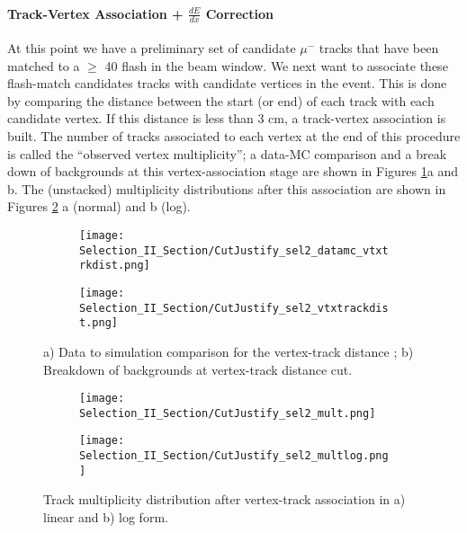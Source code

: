 \paragraph{Track-Vertex Association + $\frac{dE}{dx}$ Correction}
At this point we have a preliminary set of candidate $\mu^-$ tracks that have been matched to a $\geq$ 40 flash in the beam window. We next want to associate these flash-match candidates tracks with candidate vertices in the event. This is done by comparing the distance between the start (or end) of each track with each candidate vertex. If this distance is less than 3 cm, a track-vertex association is built.  The number of tracks associated to each vertex at the end of this procedure is called the ``observed vertex multiplicity''; a data-MC comparison and a break down of backgrounds at this vertex-association stage are shown in Figures \ref{fig:cutjust_sel2_vtxtrackdist}a and b.  The (unstacked) multiplicity distributions after this association are shown in Figures \ref{fig:cutjust_sel2_mult} a (normal) and b (log). 
\begin{figure}[h!]
\centering
  \begin{subfigure}[t]{0.4\textwidth}
    \centering
\texttt{[image: Selection\_II\_Section/CutJustify\_sel2\_datamc\_vtxtrkdist.png]}
    \caption{ }
  \end{subfigure} 
  \hspace{10 mm}
  \begin{subfigure}[t]{0.4\textwidth}
    \centering
\texttt{[image: Selection\_II\_Section/CutJustify\_sel2\_vtxtrackdist.png]}
    \caption{ }
  \end{subfigure} 
\caption{ a) Data to simulation comparison for the vertex-track distance ; b) Breakdown of backgrounds at vertex-track distance cut. }
\label{fig:cutjust_sel2_vtxtrackdist}
\end{figure}

\begin{figure}[h!]
\centering
  \begin{subfigure}[t]{0.4\textwidth}
    \centering
\texttt{[image: Selection\_II\_Section/CutJustify\_sel2\_mult.png]}
    \caption{ }
  \end{subfigure} 
  \hspace{10 mm}
  \begin{subfigure}[t]{0.4\textwidth}
    \centering
\texttt{[image: Selection\_II\_Section/CutJustify\_sel2\_multlog.png]}
    \caption{ }
  \end{subfigure} 
\caption{ Track multiplicity distribution after vertex-track association in a) linear and b) log form. }
\label{fig:cutjust_sel2_mult}
\end{figure}

